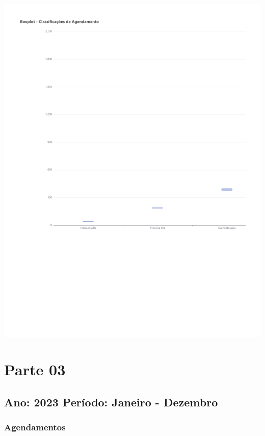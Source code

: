 \documentclass[
  letterpaper,
  DIV=11,
  numbers=noendperiod]{scrreprt}
\begin{document}
\includegraphics{intro_files/figure-pdf/unnamed-chunk-9-1.pdf}

\part{Parte 03}

\hypertarget{ano-2023-peruxedodo-janeiro---dezembro}{%
\chapter*{Ano: 2023 \textbar{} Período: Janeiro -
Dezembro}\label{ano-2023-peruxedodo-janeiro---dezembro}}


\hypertarget{agendamentos-2}{%
\section*{Agendamentos}\label{agendamentos-2}}
\end{document}
